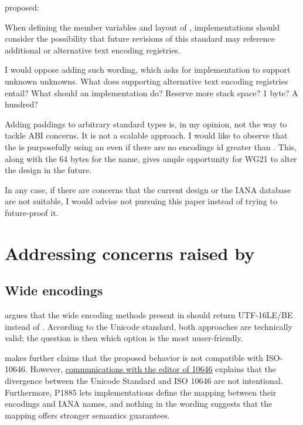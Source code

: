\documentclass{wg21}
\begin{document}
 proposed:

\begin{quoteblock}
    When defining the member variables and layout of , implementations should consider the possibility that future revisions of this standard may reference additional or alternative text encoding registries.
\end{quoteblock}

I would oppose adding such wording, which asks for implementation to support unknown unknowns.
What does supporting alternative text encoding registries entail? What should an implementation do? Reserve more stack space? 1 byte? A hundred?

Adding paddings to arbitrary standard types is, in my opinion, not the way to tackle ABI concerns. It is not a scalable approach.
I would like to observe that the  is purposefully using an  even if there are no encodings id greater than . This, along with the 64 bytes for the name, gives ample opportunity for WG21 to alter the design in the future.

In any case, if there are concerns that the current design or the IANA database are not suitable, I would advise not pursuing this paper instead of trying to future-proof it.


\label{P2491-concerns} \section{Addressing concerns raised by  }

\subsection{Wide encodings}

 argues that the wide encoding methods present in  should return UTF-16LE/BE instead of .
According to the Unicode standard, both approaches are technically valid; the question is then which option is the most uuser-friendly.

\begin{note}
     makes further claims that the proposed behavior is not compatible with ISO-10646. However, \href{https://lists.isocpp.org/sg16/2021/11/2856.php}{communications with the editor of 10646} explains that the divergence between the Unicode Standard and ISO 10646 are not intentional. Furthermore, P1885 lets implementations define the mapping between their encodings and IANA names, and nothing in the wording suggests that the mapping offers stronger semantics guarantees.
\end{note}
\end{document}
